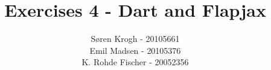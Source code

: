 \documentclass[a4paper,10pt]{article}
\author{
Søren Krogh -  20105661 \\
Emil Madsen - 20105376  \\
K. Rohde Fischer - 20052356\\}
\title{Exercises 4 - Dart and Flapjax}
\begin{document}
\maketitle

\section*{}

\begin{verbatim}

\end{verbatim}


\section*{}

\section*{}

\section*{}

\subsection*{}

\section*{}
\end{document}
